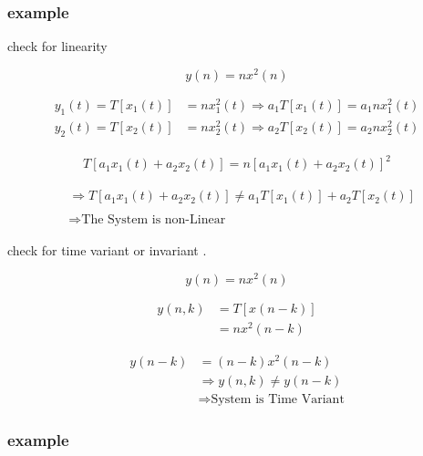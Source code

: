 \documentclass[12pt]{article}
\begin{document}
\subsubsection{example}

check for linearity

$$
y(n) = n x^{2}(n)
$$




\begin{align*}
y_{1}(t) = T[x_{1}(t)] &=  n x_{1}^{2}(t) \Rightarrow a_{1} T[x_{1}(t)] = a_{1} n x_{1}^{2}(t)  \\ 
y_{2}(t) = T[x_{2}(t)] &=  n x_{2}^{2}(t) \Rightarrow a_{2} T[x_{2}(t)] = a_{2} n x_{2}^{2}(t)
\end{align*}




\begin{align*}
T[ a_{1}x_{1}(t) + a_{2}x_{2}(t) ] = n [ a_{1}x_{1}(t) + a_{2}x_{2}(t) ]^{2} 
\end{align*}

\begin{align*}
&\Rightarrow T[ a_{1}x_{1}(t) + a_{2}x_{2}(t) ] \neq a_{1} T[x_{1}(t)] + a_{2} T[x_{2}(t)] \\ \\
&\Rightarrow \text{The System is non-Linear}
\end{align*}





check for time variant or invariant .


$$
y(n) = n x^{2}(n)
$$




\begin{align*}
y(n,k) &= T[x(n-k)] \\ 
&=  n x^{2}(n-k)
\end{align*}




\begin{align*}
y(n-k) &=  (n-k) x^{2}(n-k) \\ 
&\Rightarrow y(n,k) \neq y(n-k) \\
&\Rightarrow \text{System is Time Variant}
\end{align*}






\subsubsection{example}
\end{document}
